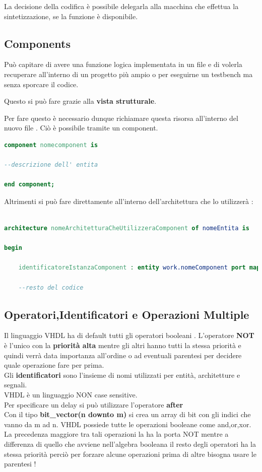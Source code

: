 \documentclass[a4paper]{book}
\begin{document}
La decisione della codifica è possibile delegarla alla macchina che effettua la sintetizzazione, se la funzione è disponibile.


\subsection{Components}

Può capitare di avere una funzione logica implementata in un file e di volerla recuperare all'interno di un progetto più ampio o per eseguirne un testbench ma senza sporcare il codice.

Questo si può fare grazie alla \textbf{vista strutturale}.

Per fare questo è necessario dunque richiamare questa risorsa all'interno del nuovo file . Ciò è possibile tramite un component.


\begin{lstlisting}[language=VHDL]
component nomecomponent is 

--descrizione dell' entita

end component;
\end{lstlisting}

Altrimenti si può fare direttamente all'interno dell'architettura che lo utilizzerà :

\begin{lstlisting}[language=VHDL]

architecture nomeArchitetturaCheUtilizzeraComponent of nomeEntita is

begin

	identificatoreIstanzaComponent : entity work.nomeComponent port map ();
	
	--resto del codice


\end{lstlisting}

\subsection{Operatori,Identificatori e Operazioni Multiple}

Il linguaggio VHDL ha di default tutti gli operatori booleani .
L'operatore \textbf{NOT} è l'unico con la \textbf{priorità alta} mentre gli altri hanno tutti la stessa priorità e quindi verrà data importanza all'ordine o ad eventuali parentesi per decidere quale operazione fare per prima.\\
Gli \textbf{identificatori} sono l'insieme di nomi utilizzati per entità, architetture e segnali.\\
VHDL è un linguaggio NON case sensitive.\\
Per specificare un delay si può utilizzare l'operatore \textbf{after}\\
Con il tipo \textbf{bit\_vector(n downto m)} si crea un array di bit con gli indici che vanno da m ad n.
VHDL possiede tutte le operazioni booleane come and,or,xor.\\
La precedenza maggiore tra tali operazioni la ha la porta NOT mentre a differenza di quello che avviene nell'algebra booleana il resto degli operatori ha la stessa priorità perciò per forzare alcune operazioni prima di altre bisogna usare le parentesi !\\
\end{document}
